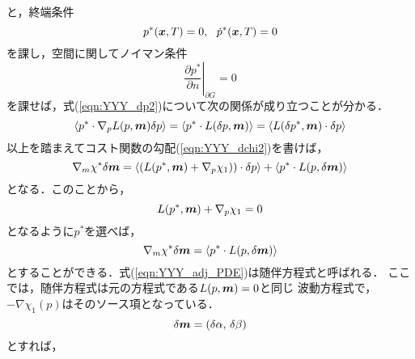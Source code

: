 と，終端条件
\begin{equation}
	p^*(\fat{x},T)=0, \ \ \dot{p}^*(\fat{x},T)=0 
	\label{eqn:YYY_12}
\end{equation}
を課し，空間に関してノイマン条件
\begin{equation}
	\left. \frac{\partial p^*}{\partial n}
	\right|_{\partial G}=0
	\label{eqn:yyy_13}
\end{equation}
を課せば，式(\ref{eqn:YYY_dp2})について次の関係が成り立つことが分かる．
\begin{equation}
	\left< p^*  \cdot \nabla_p L(p,\mbox{\boldmath $m$})\delta p \right> 
	=
	\left< p^*  \cdot L(\delta p,\mbox{\boldmath $m$})\right> 
	=
	\left< L(\delta p^*,\mbox{\boldmath $m$}) \cdot \delta p\right> 
	\label{eqn:YYY_14}
\end{equation}
以上を踏まえてコスト関数の勾配(\ref{eqn:YYY_dchi2})を書けば，
\begin{equation}
	\nabla_m \chi^* \delta \mbox{\boldmath $m$}
	=
	\left< 
		\left(L(p^*,\mbox{\boldmath $m$})+\nabla_p\chi_1)\right) \cdot \delta p
	\right>
	+
	\left< p^*  \cdot L(p,\delta \mbox{\boldmath $m$}) \right> 
	\label{eqn:YYY_dchi2_adj}
\end{equation}
となる．このことから，
\begin{equation}
	L(p^*,\mbox{\boldmath $m$})+\nabla_p\chi_1=0
	\label{eqn:YYY_adj_PDE}
\end{equation}
となるように$p^*$を選べば，
\begin{equation}
	\nabla_m \chi^* \delta \mbox{\boldmath $m$}
	=
	\left< p^*  \cdot L(p,\delta \mbox{\boldmath $m$}) \right> 
	\label{eqn:YYY_gradX0}
\end{equation}
とすることができる．式(\ref{eqn:YYY_adj_PDE})は随伴方程式と呼ばれる．
ここでは，随伴方程式は元の方程式である$L(p,\mbox{\boldmath $m$})=0$と同じ
波動方程式で，$-\nabla \chi_1(p)$はそのソース項となっている．
\begin{equation}
	\delta \mbox{\boldmath $m$}=\left( \delta \alpha, \, \delta \beta \right)
	\label{eqn:YYY_d_ab}
\end{equation}
とすれば，
